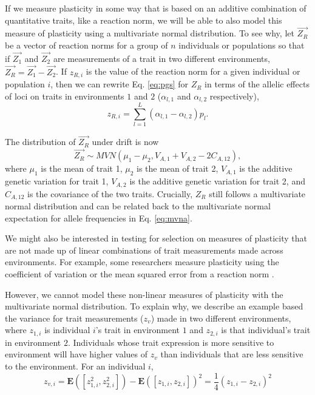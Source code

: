 \documentclass[11pt,letterpaper]{article}
\begin{document}
If we  measure plasticity in some way that is based on an additive combination of quantitative traits, like a reaction norm, we will be able to also model this measure of plasticity using a multivariate normal distribution.
To see why, let $\vec{Z_{R}}$ be a vector of reaction norms for a group of $n$ individuals or populations so that if $\vec{Z_{1}}$ and $\vec{Z_{2}}$ are measurements of a trait in two different environments, $\vec{Z_{R}} = \vec{Z_{1}} - \vec{Z_{2}}$.
If $z_{R,i }$ is the value of the reaction norm for a given individual or population $i$, then we can rewrite Eq. \ref{eq:pgs} for $Z_{R}$ in terms of the allelic effects of loci on traits in environments $1$ and $2$ ($\alpha_{l,1}$ and $\alpha_{l,2}$ respectively),
\begin{equation}
z_{R,i} = \sum^{L}_{l=1}(\alpha_{l,1}-\alpha_{l,2})p_{l}.
  \end{equation}

The distribution of $\vec{Z_{R}}$ under drift is now
\begin{equation}
\vec{Z_{R}} \sim MVN(\mu_{1} - \mu_{2}, V_{A,1} + V_{A,2} - 2C_{A, 12}),
\end{equation}
where $\mu_{1}$ is the mean of trait 1, $\mu_{2}$ is the mean of trait 2, $V_{A,1}$ is the additive genetic variation for trait 1, $V_{A,2}$ is the additive genetic variation for trait 2, and $C_{A,12}$ is the covariance of the two traits.
Crucially, $Z_{R}$ still follows a multivariate normal distribution and can be related back to the multivariate normal expectation for allele frequencies in Eq. \ref{eq:mvna}.

We might also be interested in testing for selection on measures of plasticity that are not made up of linear combinations of trait measurements made across environments.
For example, some researchers measure plasticity using the coefficient of variation or the mean squared error from a reaction norm \citep{scheepens2018phenotypic, catlin2025structural}.

However, we cannot model these non-linear measures of plasticity with the multivariate normal distribution.
To explain why, we describe an example based the variance for trait measurements ($z_{v}$) made in two different environments, where $z_{1,i}$ is individual $i$'s trait in environment $1$ and $z_{2,i}$ is that individual's trait in environment $2$.
Individuals whose trait expression is more sensitive to environment will have higher values of $z_{v}$ than individuals that are less sensitive to the environment.
For an individual $i$,
\begin{equation}
  z_{v,i} = \textbf{E}([z_{1,i}^{2}, z_{2,i}^{2}]) - \textbf{E}([z_{1,i}, z_{2,i}])^{2}
 =\frac{1}{4}(z_{1,i} - z_{2,i})^2
    \end{equation}
\end{document}
